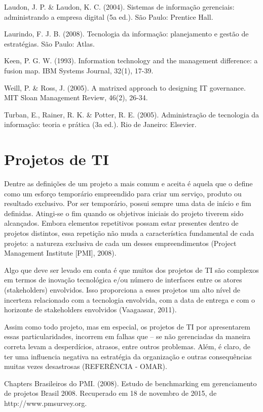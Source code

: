     Laudon, J. P. \& Laudon, K. C. (2004). Sistemas de informação gerenciais: administrando a empresa digital (5a ed.). São Paulo: Prentice Hall.

    Laurindo, F. J. B. (2008). Tecnologia da informação: planejamento e gestão de estratégias. São Paulo: Atlas.

    Keen, P. G. W. (1993). Information technology and the management difference: a fusion map. IBM Systems Journal, 32(1), 17-39.

    Weill, P. \& Ross, J. (2005). A matrixed approach to designing IT governance. MIT Sloan Management Review, 46(2), 26-34.

    Turban, E., Rainer, R. K. \& Potter, R. E. (2005). Administração de tecnologia da informação: teoria e prática (3a ed.). Rio de Janeiro: Elsevier.

  \section{Projetos de TI}

    Dentre as definições de um projeto a mais comum e aceita é aquela que o define como um esforço temporário empreendido para criar um serviço, produto ou resultado exclusivo. Por ser temporário, possui sempre uma data de início e fim definidas. Atingi-se o fim quando os objetivos iniciais do projeto tiverem sido alcançados. Embora elementos repetitivos possam estar presentes dentro de projetos distintos, essa repetição não muda a característica fundamental de cada projeto: a natureza exclusiva de cada um desses empreendimentos (Project Management Institute [PMI], 2008).

    Algo que deve ser levado em conta é que muitos dos projetos de TI são complexos em termos de inovação tecnológica e/ou número de interfaces entre os atores (stakeholders) envolvidos. Isso proporciona a esses projetos um alto nível de incerteza relacionado com a tecnologia envolvida, com a data de entrega e com o horizonte de stakeholders envolvidos (Vaagaasar, 2011).

    Assim como todo projeto, mas em especial, os projetos de TI por apresentarem essas particularidades, incorrem em falhas que – se não gerenciadas da maneira correta levam a desperdícios, atrasos, entre outros problemas. Além, é claro, de ter uma influencia negativa na estratégia da organização e outras consequências muitas vezes desastrosas (REFERÊNCIA - OMAR).

    Chapters Brasileiros do PMI. (2008). Estudo de benchmarking em gerenciamento de projetos Brasil 2008. Recuperado em 18 de novembro de 2015, de http://www.pmsurvey.org.

